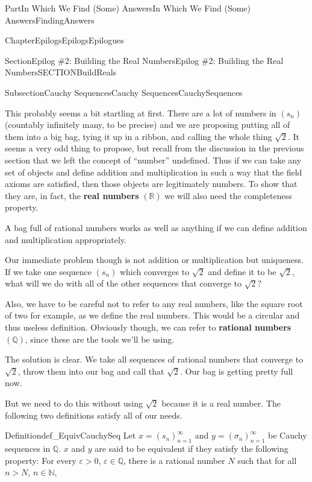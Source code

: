 \documentclass[oneside,10pt,]{book}
\newcommand{\terminology}[1]{\textbf{#1}}
\numberwithin{equation}{part}
\newcommand{\eps}{\varepsilon}
\newcommand{\RR}{\mathbb {R}}
\newcommand{\QQ}{\mathbb {Q}}
\newcommand{\NN}{\mathbb {N}}
\begin{document}
\begin{partptx}{Part}{In Which We Find (Some) Answers}{}{In Which We Find (Some) Answers}{}{}{FindingAnswers}
\begin{chapterptx}{Chapter}{Epilogs}{}{Epilogs}{}{}{Epilogues}
\begin{sectionptx}{Section}{Epilog \#2: Building the Real Numbers}{}{Epilog \#2: Building the Real Numbers}{}{}{SECTIONBuildReals}
\begin{subsectionptx}{Subsection}{Cauchy Sequences}{}{Cauchy Sequences}{}{}{CauchySequences}
\par
This probably seems a bit startling at first.  There are a lot of numbers in \(\left(s_n\right)\) (countably infinitely many, to be precise) and we are proposing putting all of them into a big bag, tying it up in a ribbon, and calling the whole thing \(\sqrt{2}\).  It seems a very odd thing to propose, but recall from the discussion in the previous section that we left the concept of ``number'' undefined.  Thus if we can take any set of objects and define addition and multiplication in such a way that the field axioms are satisfied, then those objects are legitimately numbers.  To show that they are, in fact, the \terminology{real numbers} \(\left(\RR\right)\) we will also need the completeness property.%
\par
A bag full of rational numbers works as well as anything if we can define addition and multiplication appropriately.%
\par
Our immediate problem though is not addition or multiplication but uniqueness.  If we take one sequence \(\left(s_n\right)\) which converges to \(\sqrt{2}\) and define it to be \(\sqrt{2}\), what will we do with all of the other sequences that converge to \(\sqrt{2}?\)%
\par
Also, we have to be careful not to refer to any real numbers, like the square root of two for example, as we define the real numbers. This would be a circular \textemdash{} and thus useless \textemdash{} definition.  Obviously though, we can refer to \terminology{rational numbers} \(\left(\QQ\right) \), since these are the tools we'll be using.%
\par
The solution is clear.  We take all sequences of rational numbers that converge to \(\sqrt{2}\), throw them into our bag and call that \(\sqrt{2}\). Our bag is getting pretty full now.%
\par
But we need to do this without using \(\sqrt{2}\) because it is a real number.  The following two definitions satisfy all of our needs.%
\begin{definition}{Definition}{}{def_EquivCauchySeq}%
%
%
%
Let \(x=\left(s_n\right)_{n=1}^\infty\) and \(y=\left(\sigma_n\right)_{n=1}^\infty\) be Cauchy sequences in \(\QQ\).  \(x\) and \(y\) are said to be equivalent if they satisfy the following property: For every \(\eps>0\), \(\eps\in\QQ\), there is a rational number \(N\) such that for all \(n>N\), \(n\in\NN\),%
\begin{equation*}

\end{equation*}
\end{definition}
\end{subsectionptx}
\end{sectionptx}
\end{chapterptx}
\end{partptx}
\end{document}
